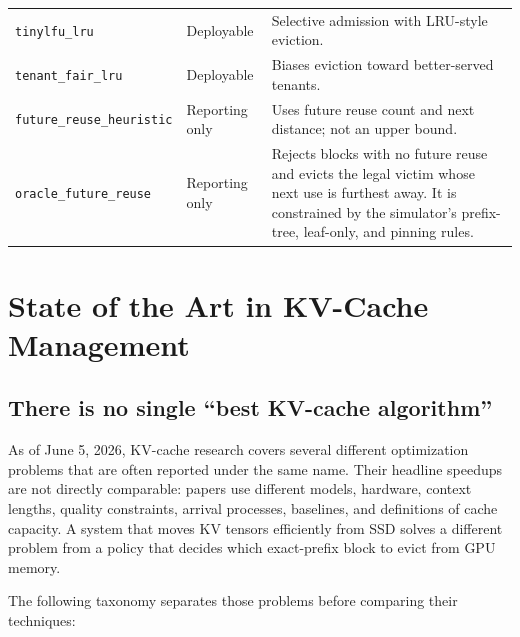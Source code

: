\documentclass[11pt]{article}
\newcommand{\identifier}[1]{\nolinkurl{#1}}
\begin{document}
\begin{longtable}{>{\ttfamily}p{}
                  >{\raggedright\arraybackslash}p{}
                  >{\raggedright\arraybackslash}p{}}
\identifier{tinylfu_lru} & Deployable & Selective admission with LRU-style eviction. \\
\identifier{tenant_fair_lru} & Deployable & Biases eviction toward better-served tenants. \\
\identifier{future_reuse_heuristic} & Reporting only & Uses future reuse count and next distance;
not an upper bound. \\
\identifier{oracle_future_reuse} & Reporting only & Rejects blocks with no future reuse and evicts
the legal victim whose next use is furthest away.  It is constrained by the simulator's
prefix-tree, leaf-only, and pinning rules. \\
\bottomrule
\end{longtable}

\section{State of the Art in KV-Cache Management}
\label{sec:state-of-the-art}

\subsection{There is no single ``best KV-cache algorithm''}

As of June 5, 2026, KV-cache research covers several different optimization problems
that are often reported under the same name.  Their headline speedups are not directly
comparable: papers use different models, hardware, context lengths, quality constraints,
arrival processes, baselines, and definitions of cache capacity.  A system that moves
KV tensors efficiently from SSD solves a different problem from a policy that decides
which exact-prefix block to evict from GPU memory.

The following taxonomy separates those problems before comparing their techniques:
\end{document}
